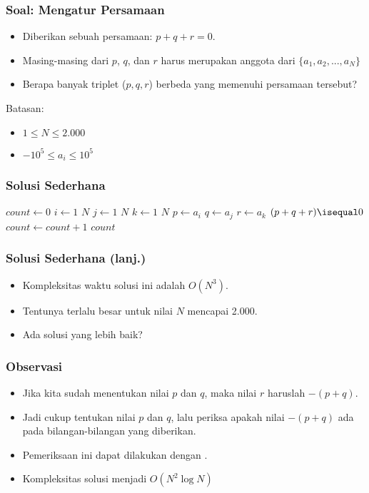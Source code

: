 \begin{frame}
\frametitle{Soal: Mengatur Persamaan}
\begin{itemize}
  \item Diberikan sebuah persamaan: $p + q + r = 0$.
  \item Masing-masing dari $p$, $q$, dan $r$ harus merupakan anggota dari $\{ a_1, a_2, ..., a_N \}$
  \item Berapa banyak triplet ($p, q, r$) berbeda yang memenuhi persamaan tersebut?
\end{itemize}

Batasan:
\begin{itemize} 
  \item $1 \leq N \leq 2.000$
  \item $-10^5 \leq a_i \leq 10^5$
\end{itemize}
\end{frame}

\begin{frame}
\frametitle{Solusi Sederhana}

\begin{codebox}
\li $count \gets 0$
\li \For $i \gets 1$ \To $N$ \Do
\li   \For $j \gets 1$ \To $N$ \Do
\li     \For $k \gets 1$ \To $N$ \Do
\li       $p \gets a_i$
\li       $q \gets a_j$
\li       $r \gets a_k$
\li       \If $(p + q + r) \isequal 0$ \Then
\li         $count \gets count + 1$
          \End
        \End
      \End
    \End
\li \Return $count$
\end{codebox}
\end{frame}

\begin{frame}
\frametitle{Solusi Sederhana (lanj.)}
\begin{itemize}
  \item Kompleksitas waktu solusi ini adalah $O(N^3)$.
  \item Tentunya terlalu besar untuk nilai $N$ mencapai 2.000.
  \item Ada solusi yang lebih baik?
\end{itemize}
\end{frame}

\begin{frame}
\frametitle{Observasi}
\begin{itemize}
  \item Jika kita sudah menentukan nilai $p$ dan $q$, maka nilai $r$ haruslah $-(p + q)$.
  \item Jadi cukup tentukan nilai $p$ dan $q$, lalu periksa apakah nilai $-(p + q)$ ada pada bilangan-bilangan yang diberikan.
  \item Pemeriksaan ini dapat dilakukan dengan \fBinarySearch.
  \item Kompleksitas solusi menjadi $O(N^2 \log{N})$
\end{itemize}
\end{frame}

